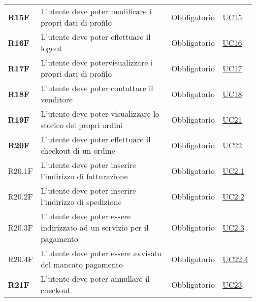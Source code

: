 \begin{center}
\begin{longtable}[!h]{p{50px} p{210px} p{80px} p{50px}}
        \textbf{R15F}                                 & L'utente deve poter modificare i propri dati di profilo                                          & Obbligatorio             & \hyperref[sec:UC15]{UC15}     \\
        \textbf{R16F}                                 & L'utente deve poter effettuare il logout                                                         & Obbligatorio             & \hyperref[sec:UC16]{UC16}     \\
        \textbf{R17F}                                 & L'utente deve potervisualizzare i propri dati di profilo                                         & Obbligatorio             & \hyperref[sec:UC17]{UC17}     \\
        \textbf{R18F}                                 & L'utente deve poter contattare il venditore                                                            & Obbligatorio             & \hyperref[sec:UC18]{UC18}     \\
        \textbf{R19F}                                 & L'utente deve poter visualizzare lo storico dei propri ordini                                    & Obbligatorio             & \hyperref[sec:UC21]{UC21}     \\
        \textbf{R20F}                                 & L'utente deve poter effettuare il checkout di un ordine                                          & Obbligatorio             & \hyperref[sec:UC22]{UC22}     \\
        R20.1F                               & L'utente deve poter inserire l'indirizzo di fatturazione                                         & Obbligatorio             & \hyperref[sec:UC22]{UC2.1}    \\
        R20.2F                               & L'utente deve poter inserire l'indirizzo di spedizione                                           & Obbligatorio             & \hyperref[sec:UC22]{UC2.2}    \\
        R20.3F                               & L'utente deve poter essere indirizzato ad un servizio per il pagamento                           & Obbligatorio             & \hyperref[sec:UC22.3]{UC2.3}  \\
        R20.4F                               & L'utente deve poter essere avvisato del mancato pagamento                                        & Obbligatorio             & \hyperref[sec:UC22.4]{UC22.4} \\
        \textbf{R21F}                                 & L'utente deve poter annullare il checkout                                                        & Obbligatorio             & \hyperref[sec:UC23]{UC23}     \\

\end{longtable}
\end{center}
